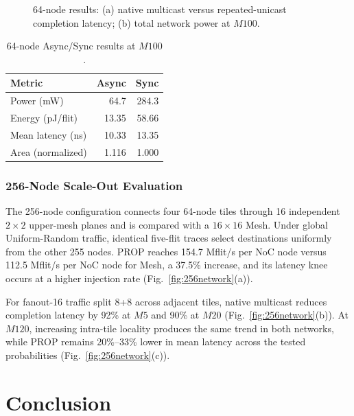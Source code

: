 \documentclass[conference]{IEEEtran}
\begin{document}
\begin{figure}[t]
\centering

\caption{64-node results: (a) native multicast versus repeated-unicast completion latency; (b) total network power at \(M100\).}
\label{fig:64-multicast-power}
\end{figure}

\begin{table}[t]
\caption{64-node Async/Sync results at \(M100\).}
\label{tab:async-sync-network}
\centering
\scriptsize
\setlength{\tabcolsep}{4.5pt}
\begin{tabular}{lrr}
\toprule
Metric & Async & Sync \\
\midrule
Power (mW) & 64.7 & 284.3 \\
Energy (pJ/flit) & 13.35 & 58.66 \\
Mean latency (ns) & 10.33 & 13.35 \\
Area (normalized) & 1.116 & 1.000 \\
\bottomrule
\end{tabular}
\end{table}

\subsubsection{256-Node Scale-Out Evaluation}

The 256-node configuration connects four 64-node tiles through 16 independent
\(2\times2\) upper-mesh planes and is compared with a \(16\times16\) Mesh.
Under global Uniform-Random traffic, identical five-flit traces select destinations
uniformly from the other 255 nodes. PROP reaches 154.7 Mflit/s per NoC node
versus 112.5 Mflit/s per NoC node for Mesh, a 37.5\% increase, and its
latency knee occurs at a higher injection rate (Fig.~\ref{fig:256network}(a)).

For fanout-16 traffic split 8+8 across adjacent tiles, native multicast
reduces completion latency by 92\% at \(M5\) and 90\% at \(M20\)
(Fig.~\ref{fig:256network}(b)). At \(M120\), increasing intra-tile locality
produces the same trend in both networks, while PROP remains 20\%--33\%
lower in mean latency across the tested probabilities (Fig.~\ref{fig:256network}(c)).

\section{Conclusion}\label{sec:conclusion}
\end{document}
